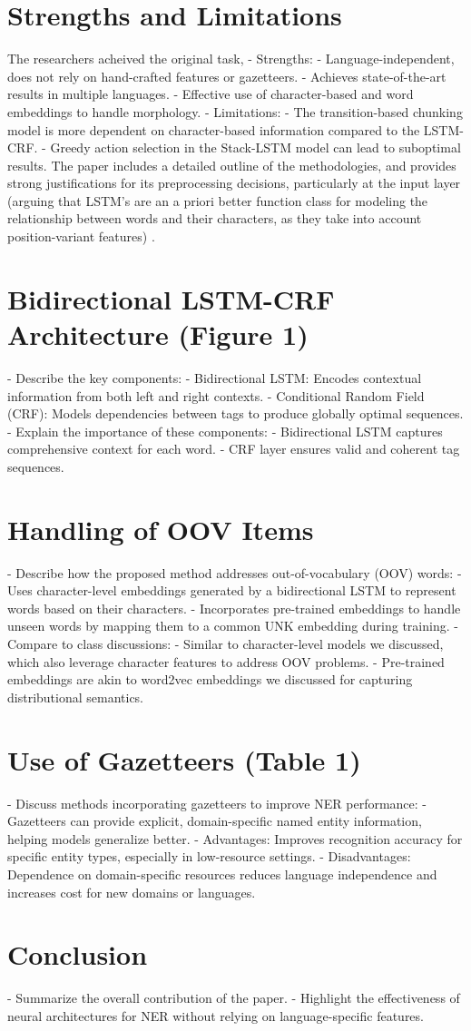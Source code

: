 \documentclass[11pt]{article}
\begin{document}
\section*{Strengths and Limitations}
The researchers acheived the original task, 
- Strengths:
  - Language-independent, does not rely on hand-crafted features or gazetteers.
  - Achieves state-of-the-art results in multiple languages.
  - Effective use of character-based and word embeddings to handle morphology.
- Limitations:
  - The transition-based chunking model is more dependent on character-based information compared to the LSTM-CRF.
  - Greedy action selection in the Stack-LSTM model can lead to suboptimal results.
  The paper includes a detailed outline
  of the methodologies, and provides strong 
  justifications for its preprocessing decisions, 
  particularly at the input layer (arguing that LSTM's 
  are an a priori better function class for modeling 
  the relationship between words and their characters, 
  as they take into account position-variant features) .
\section*{Bidirectional LSTM-CRF Architecture (Figure 1)}
- Describe the key components:
  - Bidirectional LSTM: Encodes contextual information from both left and right contexts.
  - Conditional Random Field (CRF): Models dependencies between tags to produce globally optimal sequences.
- Explain the importance of these components:
  - Bidirectional LSTM captures comprehensive context for each word.
  - CRF layer ensures valid and coherent tag sequences.

\section*{Handling of OOV Items}
- Describe how the proposed method addresses out-of-vocabulary (OOV) words:
  - Uses character-level embeddings generated by a bidirectional LSTM to represent words based on their characters.
  - Incorporates pre-trained embeddings to handle unseen words by mapping them to a common UNK embedding during training.
- Compare to class discussions:
  - Similar to character-level models we discussed, which also leverage character features to address OOV problems.
  - Pre-trained embeddings are akin to word2vec embeddings we discussed for capturing distributional semantics.

\section*{Use of Gazetteers (Table 1)}
- Discuss methods incorporating gazetteers to improve NER performance:
  - Gazetteers can provide explicit, domain-specific named entity information, helping models generalize better.
  - Advantages: Improves recognition accuracy for specific entity types, especially in low-resource settings.
  - Disadvantages: Dependence on domain-specific resources reduces language independence and increases cost for new domains or languages.

\section*{Conclusion}
- Summarize the overall contribution of the paper.
- Highlight the effectiveness of neural architectures for NER without relying on language-specific features.
\end{document}
